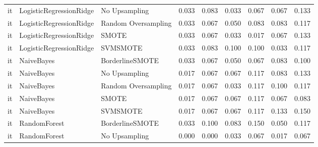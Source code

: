 \begin{tabular}{lllllllll}
      it &      LogisticRegressionRidge &       No Upsampling & 0.033 &                     0.083 &                 0.033 &                  0.067 &                                   0.067 &     0.133 \\
      it &      LogisticRegressionRidge & Random Oversampling & 0.033 &                     0.067 &                 0.050 &                  0.083 &                                   0.083 &     0.117 \\
      it &      LogisticRegressionRidge &               SMOTE & 0.033 &                     0.067 &                 0.033 &                  0.017 &                                   0.067 &     0.133 \\
      it &      LogisticRegressionRidge &            SVMSMOTE & 0.033 &                     0.083 &                 0.100 &                  0.100 &                                   0.033 &     0.117 \\
      it &                   NaiveBayes &     BorderlineSMOTE & 0.033 &                     0.067 &                 0.050 &                  0.067 &                                   0.083 &     0.100 \\
      it &                   NaiveBayes &       No Upsampling & 0.017 &                     0.067 &                 0.067 &                  0.117 &                                   0.083 &     0.133 \\
      it &                   NaiveBayes & Random Oversampling & 0.017 &                     0.067 &                 0.033 &                  0.117 &                                   0.100 &     0.117 \\
      it &                   NaiveBayes &               SMOTE & 0.017 &                     0.067 &                 0.067 &                  0.117 &                                   0.067 &     0.083 \\
      it &                   NaiveBayes &            SVMSMOTE & 0.017 &                     0.067 &                 0.067 &                  0.117 &                                   0.133 &     0.150 \\
      it &                 RandomForest &     BorderlineSMOTE & 0.033 &                     0.100 &                 0.083 &                  0.150 &                                   0.050 &     0.117 \\
      it &                 RandomForest &       No Upsampling & 0.000 &                     0.000 &                 0.033 &                  0.067 &                                   0.017 &     0.067 \\

\end{tabular}
